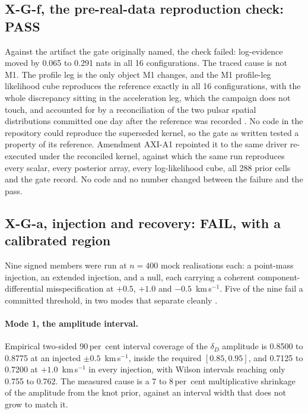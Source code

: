 \documentclass[11pt]{article}
\newcommand{\dD}{\ensuremath{\delta_D}}
\begin{document}
\subsection{X-G-f, the pre-real-data reproduction check: PASS}
\label{sec:gates-f}

Against the artifact the gate originally named, the check failed: log-evidence moved by 0.065 to 0.291 nats in all 16 configurations. The traced cause is not M1. The profile leg is the only object M1 changes, and the M1 profile-leg likelihood cube reproduces the reference exactly in all 16 configurations, with the whole discrepancy sitting in the acceleration leg, which the campaign does not touch, and accounted for by a reconciliation of the two pulsar spatial distributions committed one day after the reference was recorded \citep{AXIGatesReport2026}. No code in the repository could reproduce the superseded kernel, so the gate as written tested a property of its reference. Amendment AXI-A1 repointed it to the same driver re-executed under the reconciled kernel, against which the same run reproduces every scalar, every posterior array, every log-likelihood cube, all 288 prior cells and the gate record. No code and no number changed between the failure and the pass.

\subsection{X-G-a, injection and recovery: FAIL, with a calibrated region}
\label{sec:gates-a}

Nine signed members were run at $n = 400$ mock realisations each: a point-mass injection, an extended injection, and a null, each carrying a coherent component-differential misspecification at $+0.5$, $+1.0$ and $-0.5$~km\,s$^{-1}$. Five of the nine fail a committed threshold, in two modes that separate cleanly \citep{AXIGatesReport2026}.

\paragraph{Mode 1, the amplitude interval.} Empirical two-sided 90\,per~cent interval coverage of the \dD{} amplitude is 0.8500 to 0.8775 at an injected $\pm0.5$~km\,s$^{-1}$, inside the required $[0.85, 0.95]$, and 0.7125 to 0.7200 at $+1.0$~km\,s$^{-1}$ in every injection, with Wilson intervals reaching only 0.755 to 0.762. The measured cause is a 7 to 8\,per~cent multiplicative shrinkage of the amplitude from the knot prior, against an interval width that does not grow to match it.
\end{document}
